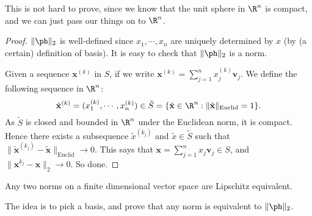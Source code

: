 \documentclass[a4paper]{article}
\begin{document}
This is not hard to prove, since we know that the unit sphere in $\R^n$ is compact, and we can just pass our things on to $\R^n$.

\begin{proof}
  $\|\ph\|_2$ is well-defined since $x_1, \cdots, x_n$ are uniquely determined by $x$ (by (a certain) definition of basis). It is easy to check that $\|\ph\|_2$ is a norm.

  Given a sequence $\mathbf{x}^{(k)}$ in $S$, if we write $\mathbf{x}^{(k)} = \sum_{j = 1}^n x_j^{(k)} \mathbf{v}_j$. We define the following sequence in $\R^n$:
  \[
    \tilde{\mathbf{x}}^{(k)} = (x_1^{(k)},\cdots, x_n^{(k)}) \in \tilde{S} = \{\tilde{\mathbf{x}} \in \R^n: \|\tilde{\mathbf{x}}\|_{\mathrm{Euclid}} = 1\}.
  \]
  As $\tilde{S}$ is closed and bounded in $\R^n$ under the Euclidean norm, it is compact. Hence there exists a subsequence $\tilde{x}^{(k_j)}$ and $\tilde{x} \in \tilde{S}$ such that $\|\tilde{\mathbf{x}}^{(k_j)} - \tilde{\mathbf{x}} \|_{\mathrm{Euclid}} \to 0$. This says that $\mathbf{x} = \sum_{j = 1}^n x_j \mathbf{v}_j \in S$, and $\|\mathbf{x}^{k_j} - \mathbf{x}\|_2 \to 0$. So done.
\end{proof}

\begin{thm}
  Any two norms on a finite dimensional vector space are Lipschitz equivalent.
\end{thm}

The idea is to pick a basis, and prove that any norm is equivalent to $\|\ph\|_2$.
\end{document}
